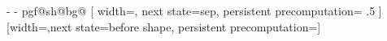 {{{      \pgf@x-\pgf@x%
      \pgf@y-\pgf@y%
    }%
    \csname pgf@sh@bg@\endcsname%
  }%
  [
    width=\pgf@lib@shapedecoration@aftershape-1sp,
    next state=sep,
    persistent precomputation=
    {
      \ifpgf@lib@shapedecoration@betweenborders%
        \pgf@x\pgf@lib@shapedecoration@width\relax%
        \pgf@x.5\pgf@x%
        \edef\pgf@lib@shapedecoration@aftershape{\the\pgf@x}%
      \else%
        \edef\pgf@lib@shapedecoration@aftershape{0pt}%
      \fi%
    }
  ]
  {}%
  [width=\pgf@lib@shapedecoration@sep,next state=before shape,
              persistent precomputation=\def\pgf@lib@shapedecoration@beforeshape{0pt}]
  {}%
  {
    \pgfpathmoveto{\pgfpointdecoratedpathlast}%
  }%
}%

\def\pgf@lib@shapedecoration@setkeyword,{%
  \pgfutil@ifnextchar\pgf@stop{\def\pgf@temp{}\pgf@lib@@@shapedecoration@setkeyword}{\pgf@lib@@shapedecoration@setkeyword}%
}%
\def\pgf@lib@@shapedecoration@setkeyword#1,{\def\pgf@temp{#1}\pgf@lib@@@shapedecoration@setkeyword}%
\def\pgf@lib@@@shapedecoration@setkeyword\pgf@stop{%
  \ifx\pgf@temp\pgf@lib@shapedecoration@borderstext%
    \pgf@lib@shapedecoration@betweenborderstrue%
  \else%
    \pgf@lib@shapedecoration@betweenbordersfalse%
  \fi%
}%



\endinput
